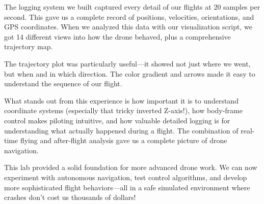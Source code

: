 The logging system we built captured every detail of our flights at 20 samples per second. This gave us a complete record of positions, velocities, orientations, and GPS coordinates. When we analyzed this data with our visualization script, we got 14 different views into how the drone behaved, plus a comprehensive trajectory map.

The trajectory plot was particularly useful—it showed not just where we went, but when and in which direction. The color gradient and arrows made it easy to understand the sequence of our flight.

What stands out from this experience is how important it is to understand coordinate systems (especially that tricky inverted Z-axis!), how body-frame control makes piloting intuitive, and how valuable detailed logging is for understanding what actually happened during a flight. The combination of real-time flying and after-flight analysis gave us a complete picture of drone navigation.

This lab provided a solid foundation for more advanced drone work. We can now experiment with autonomous navigation, test control algorithms, and develop more sophisticated flight behaviors—all in a safe simulated environment where crashes don't cost us thousands of dollars!

\clearpage